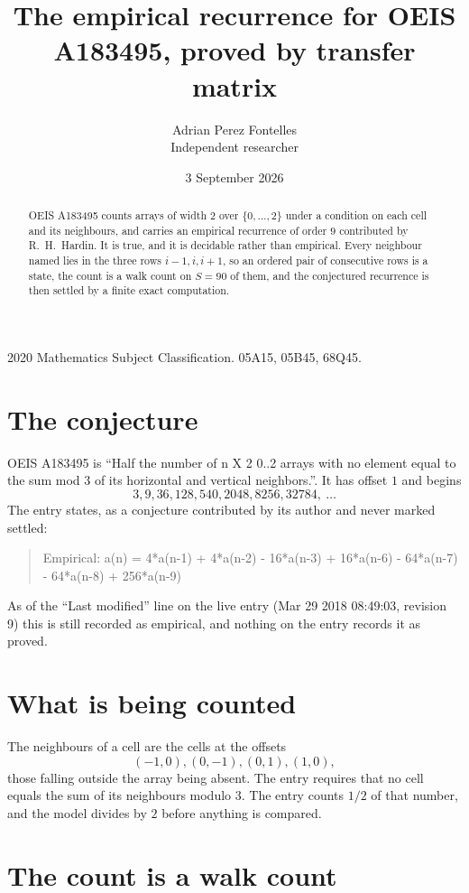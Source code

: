 \documentclass[11pt,a4paper]{article}
\title{The empirical recurrence for OEIS A183495, proved by transfer matrix}
\author{Adrian Perez Fontelles\\ \small Independent researcher}
\date{3 September 2026}
\theoremstyle{plain}
\theoremstyle{definition}
\begin{document}
\maketitle

\begin{abstract}
OEIS A183495 counts arrays of width $2$ over $\{0,\dots,2\}$ under a condition on each cell
and its neighbours, and carries an empirical recurrence of order $9$ contributed by
R.~H.~Hardin. It is true, and it is decidable rather than empirical. Every neighbour named lies
in the three rows $i-1,i,i+1$, so an ordered pair of consecutive rows is a state, the count is
a walk count on $S=90$ of them, and the conjectured recurrence is then settled by a finite
exact computation.
\end{abstract}

\noindent\small 2020 Mathematics Subject Classification. 05A15, 05B45, 68Q45.\normalsize

\section{The conjecture}

OEIS A183495 is ``Half the number of n X 2 0..2 arrays with no element equal to the sum mod 3 of its horizontal and vertical neighbors.''. It has offset $1$ and begins
\[
3, 9, 36, 128, 540, 2048, 8256, 32784,\ \dots
\]
The entry states, as a conjecture contributed by its author and never marked settled:
\begin{quote}
Empirical: a(n) = 4*a(n-1) + 4*a(n-2) - 16*a(n-3) + 16*a(n-6) - 64*a(n-7) - 64*a(n-8) + 256*a(n-9)
\end{quote}
As of the ``Last modified'' line on the live entry (Mar 29 2018 08:49:03, revision 9) this is still
recorded as empirical, and nothing on the entry records it as proved.

\section{What is being counted}

The neighbours of a cell are the cells at the offsets
\[
(-1,0), (0,-1), (0,1), (1,0),
\]
those falling outside the array being absent. The entry requires that no cell equals the sum of its neighbours modulo $3$. The entry counts $1/2$ of that number, and the model divides by $2$ before anything is compared.

\section{The count is a walk count}
\end{document}
